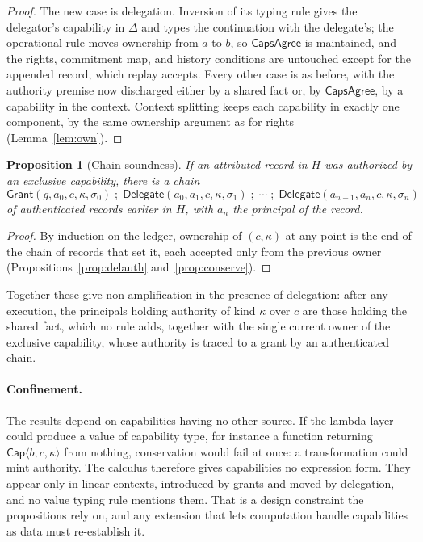 \documentclass[11pt,openany]{book}
\newtheorem{proposition}[theorem]{Proposition}
\theoremstyle{remark}
\begin{document}
\begin{proof}
The new case is delegation. Inversion of its typing rule gives the
delegator's capability in $\Delta$ and types the continuation with the
delegate's; the operational rule moves ownership from $a$ to $b$, so
$\mathsf{CapsAgree}$ is maintained, and the rights, commitment map, and
history conditions are untouched except for the appended record, which
replay accepts. Every other case is as before, with the authority premise
now discharged either by a shared fact or, by $\mathsf{CapsAgree}$, by a
capability in the context. Context splitting keeps each capability in
exactly one component, by the same ownership argument as for rights
(Lemma~\ref{lem:own}).
\end{proof}

\begin{proposition}[Chain soundness]\label{prop:chain}
If an attributed record in $H$ was authorized by an exclusive capability,
there is a chain
\[
\mathsf{Grant}(g,a_0,c,\kappa,\sigma_0)\;;\;
\mathsf{Delegate}(a_0,a_1,c,\kappa,\sigma_1)\;;\;\cdots\;;\;
\mathsf{Delegate}(a_{n-1},a_n,c,\kappa,\sigma_n)
\]
of authenticated records earlier in $H$, with $a_n$ the principal of the
record.
\end{proposition}

\begin{proof}
By induction on the ledger, ownership of $(c,\kappa)$ at any point is the
end of the chain of records that set it, each accepted only from the
previous owner (Propositions~\ref{prop:delauth} and~\ref{prop:conserve}).
\end{proof}

Together these give non-amplification in the presence of delegation:
after any execution, the principals holding authority of kind $\kappa$
over $c$ are those holding the shared fact, which no rule adds, together
with the single current owner of the exclusive capability, whose
authority is traced to a grant by an authenticated chain.

\paragraph{Confinement.} The results depend on capabilities having no
other source. If the lambda layer could produce a value of capability
type, for instance a function returning
$\mathsf{Cap}\langle b,c,\kappa\rangle$ from nothing, conservation would
fail at once: a transformation could mint authority. The calculus
therefore gives capabilities no expression form. They appear only in
linear contexts, introduced by grants and moved by delegation, and no
value typing rule mentions them. That is a design constraint the
propositions rely on, and any extension that lets computation handle
capabilities as data must re-establish it.
\end{document}
